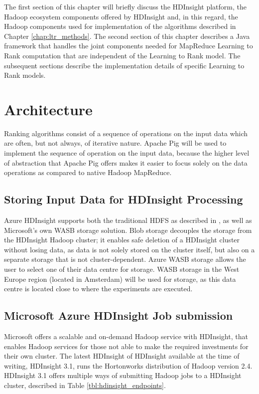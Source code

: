 \label{chap:implementation}
The first section of this chapter will briefly discuss the HDInsight platform, the Hadoop ecosystem components offered by HDInsight and, in this regard, the Hadoop components used for implementation of the algorithms described in Chapter \ref{chap:ltr_methods}. The second section of this chapter describes a Java framework that handles the joint components needed for MapReduce Learning to Rank computation that are independent of the Learning to Rank model. The subsequent sections describe the implementation details of specific Learning to Rank models.

\section{Architecture}
Ranking algorithms consist of a sequence of operations on the input data which are often, but not always, of iterative nature. Apache Pig \cite{Olston2008} will be used to implement the sequence of operation on the input data, because the higher level of abstraction that Apache Pig offers makes it easier to focus solely on the data operations as compared to native Hadoop MapReduce.\\

\subsection{Storing Input Data for HDInsight Processing}
Azure HDInsight supports both the traditional \ac{HDFS} as described in \cite{Shvachko2010}, as well as Microsoft's own \ac{WASB} storage solution. Blob storage decouples the storage from the HDInsight Hadoop cluster; it enables safe deletion of a HDInsight cluster without losing data, as data is not solely stored on the cluster itself, but also on a separate storage that is not cluster-dependent. Azure \ac{WASB} storage allows the user to select one of their data centre for storage. \ac{WASB} storage in the West Europe region (located in Amsterdam) will be used for storage, as this data centre is located close to where the experiments are executed.

\subsection{Microsoft Azure HDInsight Job submission}
Microsoft offers a scalable and on-demand Hadoop service with HDInsight, that enables Hadoop services for those not able to make the required investments for their own cluster. The latest HDInsight of HDInsight available at the time of writing, HDInsight 3.1, runs the Hortonworks distribution of Hadoop version 2.4. HDInsight 3.1 offers multiple ways of submitting Hadoop jobs to a HDInsight cluster, described in Table \ref{tbl:hdinsight_endpoints}.\\

